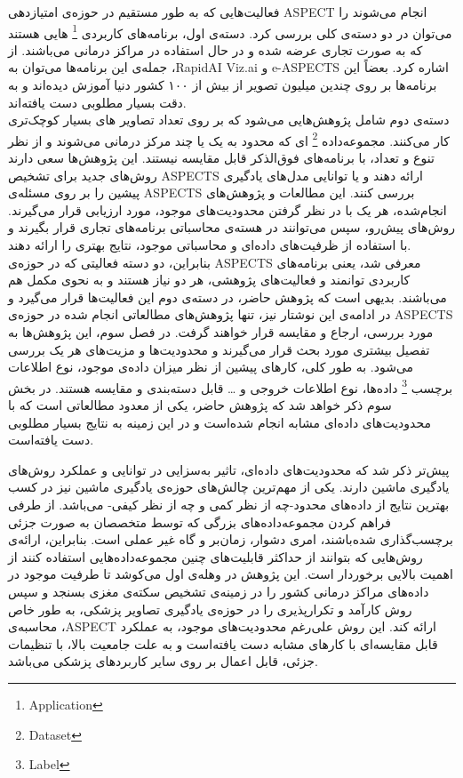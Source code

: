 فعالیت‌هایی که به طور مستقیم در حوزه‌ی امتیازدهی ASPECT انجام می‌شوند را می‌توان در دو دسته‌ی کلی بررسی کرد.
دسته‌ی اول، برنامه‌های کاربردی
\footnote{Application} ‌هایی هستند 
که به صورت تجاری عرضه شده و در حال استفاده در مراکز درمانی می‌باشند.
از جمله‌ی این برنامه‌ها می‌توان به ،RapidAI Viz.ai و e-ASPECTS اشاره کرد.
بعضاً این برنامه‌ها بر روی چندین میلیون تصویر از بیش از ۱۰۰ کشور دنیا آموزش دیده‌اند
\cite{rapidai}
و به دقت بسیار مطلوبی دست یافته‌اند.\\
دسته‌ی دوم شامل پژوهش‌هایی می‌شود که بر روی
تعداد تصاویر
های بسیار کوچک‌تری کار می‌کنند.
مجموعه‌داده‌
\footnote{Dataset}
ای که محدود به یک یا چند مرکز درمانی می‌شوند و از نظر تنوع و تعداد،‌ با برنامه‌های فوق‌الذکر قابل مقایسه نیستند.
این پژوهش‌ها سعی دارند روش‌های جدید برای تشخیص ASPECTS ارائه دهند و یا توانایی مدل‌های یادگیری پیشین را بر روی مسئله‌ی ASPECTS بررسی کنند.
 این مطالعات و پژوهش‌های انجام‌شده، هر یک با در نظر 
 گرفتن محدودیت‌های  موجود، مورد ارزیابی قرار 
 می‌گیرند.
روش‌های پیش‌رو، سپس می‌توانند در هسته‌ی محاسباتی برنامه‌های تجاری قرار بگیرند 
و با استفاده از ظرفیت‌های داده‌ای و محاسباتی موجود، نتایج بهتری را ارائه دهند.\\
بنابراین، دو دسته فعالیتی که در حوزه‌ی ASPECTS معرفی شد، یعنی برنامه‌های کاربردی توانمند و فعالیت‌های پژوهشی، هر دو نیاز هستند و به نحوی مکمل هم می‌باشند.
بدیهی‌ است که پژوهش حاضر، در دسته‌ی دوم این فعالیت‌ها قرار می‌گیرد
و در ادامه‌ی این نوشتار نیز، تنها پژوهش‌های مطالعاتی انجام شده در حوزه‌ی ASPECTS مورد بررسی، ارجاع و مقایسه قرار خواهند گرفت.
در فصل سوم، این پژوهش‌ها به تفصیل بیشتری مورد 
بحث قرار می‌‌گیرند و
محدودیت‌ها و مزیت‌های هر یک بررسی می‌شود.
به طور کلی، کار‌های پیشین از نظر میزان داده‌ی موجود، نوع اطلاعات برچسب
\footnote{Label}
داده‌ها،
نوع اطلاعات خروجی و
\dots 
قابل دسته‌بندی و مقایسه هستند.
در بخش سوم ذکر خواهد شد که پژوهش حاضر، یکی از معدود مطالعاتی است که با محدودیت‌های داده‌ای مشابه انجام شده‌است و 
در این زمینه به نتایج بسیار مطلوبی دست یافته‌است.


پیش‌تر ذکر شد که محدودیت‌های داده‌ای، تاثیر به‌سزایی در توانایی و عملکرد روش‌های یادگیری ماشین دارند.
یکی از مهم‌ترین چالش‌های حوزه‌ی یادگیری ماشین نیز در کسب بهترین نتایج از داده‌های محدود-چه از نظر کمی و چه از نظر کیفی- می‌باشد.
از طرفی فراهم کردن مجموعه‌داده‌های بزرگی که توسط متخصصان به صورت جزئی برچسب‌گذاری شده‌باشند، امری دشوار، زمان‌بر و گاه غیر عملی است.
بنابراین، ارائه‌ی روش‌هایی که بتوانند از حداکثر قابلیت‌های چنین مجموعه‌داده‌هایی استفاده کنند از اهمیت بالایی برخوردار است.
این پژوهش در وهله‌ی اول می‌کوشد تا طرفیت موجود در داده‌های مراکز درمانی کشور را در زمینه‌ی تشخیص سکته‌ی مغزی بسنجد و سپس روش کارآمد و تکرارپذیری را در حوزه‌ی یادگیری تصاویر پزشکی، به طور خاص محاسبه‌ی ،ASPECT ارائه کند.
این روش علی‌رغم محدودیت‌های موجود، به عملکرد قابل مقایسه‌ای با کارهای مشابه دست یافته‌است و
به علت جامعیت بالا، با تنظیمات جزئی، قابل اعمال بر روی سایر کاربرد‌های پزشکی می‌باشد.


